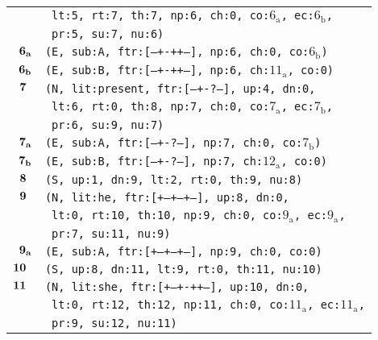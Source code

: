 \documentclass{article}
\begin{document}
\begin{minipage}{\textwidth}
{\begin{tabular}{|r|l|}
    & \texttt{\texttt{~lt:5,~rt:7,~th:7,~np:6,~ch:0,~co:${\textrm{6}_{\textrm{a}}}$,~ec:${\textrm{6}_{\textrm{b}}}$,}} \\
    & \texttt{\texttt{~pr:5,~su:7,~nu:6)}} \\
    ${\textbf{\textrm{6}}_{\textbf{\textrm{a}}}}$ & \texttt{\texttt{(E,~sub:A,~ftr:[---+-++--],~np:6,~ch:0,~co:${\textrm{6}_{\textrm{b}}}$)}} \\
    ${\textbf{\textrm{6}}_{\textbf{\textrm{b}}}}$ & \texttt{\texttt{(E,~sub:B,~ftr:[---+-++--],~np:6,~ch:${\textrm{11}_{\textrm{a}}}$,~co:0)}} \\
    ${\textbf{\textrm{7}}_{\phantom{z}}}$ & \texttt{\texttt{(N,~lit:present,~ftr:[---+-?---],~up:4,~dn:0,}} \\
    & \texttt{\texttt{~lt:6,~rt:0,~th:8,~np:7,~ch:0,~co:${\textrm{7}_{\textrm{a}}}$,~ec:${\textrm{7}_{\textrm{b}}}$,}} \\
    & \texttt{\texttt{~pr:6,~su:9,~nu:7)}} \\
    ${\textbf{\textrm{7}}_{\textbf{\textrm{a}}}}$ & \texttt{\texttt{(E,~sub:A,~ftr:[---+-?---],~np:7,~ch:0,~co:${\textrm{7}_{\textrm{b}}}$)}} \\
    ${\textbf{\textrm{7}}_{\textbf{\textrm{b}}}}$ & \texttt{\texttt{(E,~sub:B,~ftr:[---+-?---],~np:7,~ch:${\textrm{12}_{\textrm{a}}}$,~co:0)}} \\
    ${\textbf{\textrm{8}}_{\phantom{z}}}$ & \texttt{\texttt{(S,~up:1,~dn:9,~lt:2,~rt:0,~th:9,~nu:8)}} \\
    ${\textbf{\textrm{9}}_{\phantom{z}}}$ & \texttt{\texttt{(N,~lit:he,~ftr:[+--+--+--],~up:8,~dn:0,}} \\
    & \texttt{\texttt{~lt:0,~rt:10,~th:10,~np:9,~ch:0,~co:${\textrm{9}_{\textrm{a}}}$,~ec:${\textrm{9}_{\textrm{a}}}$,}} \\
    & \texttt{\texttt{~pr:7,~su:11,~nu:9)}} \\
    ${\textbf{\textrm{9}}_{\textbf{\textrm{a}}}}$ & \texttt{\texttt{(E,~sub:A,~ftr:[+--+--+--],~np:9,~ch:0,~co:0)}} \\
    ${\textbf{\textrm{10}}_{\phantom{z}}}$ & \texttt{\texttt{(S,~up:8,~dn:11,~lt:9,~rt:0,~th:11,~nu:10)}} \\
    ${\textbf{\textrm{11}}_{\phantom{z}}}$ & \texttt{\texttt{(N,~lit:she,~ftr:[+--+-++--],~up:10,~dn:0,}} \\
    & \texttt{\texttt{~lt:0,~rt:12,~th:12,~np:11,~ch:0,~co:${\textrm{11}_{\textrm{a}}}$,~ec:${\textrm{11}_{\textrm{a}}}$,}} \\
    & \texttt{\texttt{~pr:9,~su:12,~nu:11)}} \\

\end{tabular}}
\end{minipage}
\end{document}
